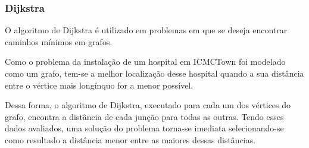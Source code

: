 \subsubsection{Dijkstra}

O algoritmo de Dijkstra é utilizado em problemas em que se deseja encontrar caminhos mínimos em grafos. 

Como o problema da instalação de um hospital em ICMCTown foi modelado como um grafo, tem-se a melhor localização desse hospital quando a sua distância entre o vértice mais longínquo for a menor possível.
    
Dessa forma, o algoritmo de Dijkstra, executado para cada um dos vértices do grafo, encontra a distância de cada junção para todas as outras. Tendo esses dados avaliados, uma solução do problema torna-se imediata selecionando-se como resultado a distância menor entre as maiores dessas distâncias.

